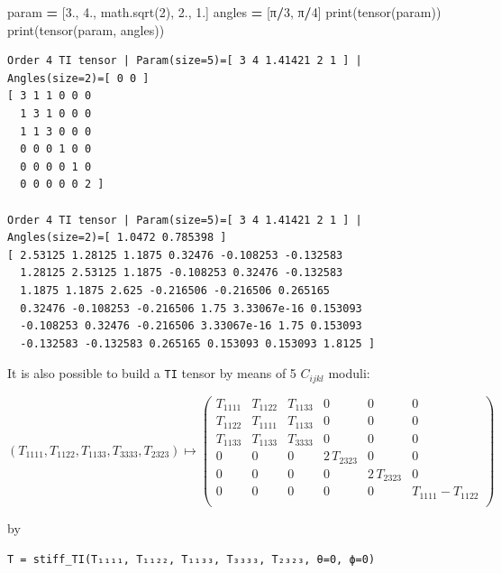 \documentclass[
  a4paper,
  numbers=noendperiod,
  DIV=12]{scrreprt}
\newenvironment{Shaded}{\begin{snugshade}}{\end{snugshade}}
\newcommand{\BuiltInTok}[1]{#1}
\newcommand{\DecValTok}[1]{\textcolor[rgb]{0.00,0.00,0.81}{#1}}
\newcommand{\FloatTok}[1]{\textcolor[rgb]{0.00,0.00,0.81}{#1}}
\newcommand{\NormalTok}[1]{#1}
\newcommand{\OperatorTok}[1]{\textcolor[rgb]{0.81,0.36,0.00}{\textbf{#1}}}
\begin{document}
\begin{Shaded}
\begin{Highlighting}[]
\NormalTok{param }\OperatorTok{=}\NormalTok{ [}\FloatTok{3.}\NormalTok{, }\FloatTok{4.}\NormalTok{, math.sqrt(}\DecValTok{2}\NormalTok{), }\FloatTok{2.}\NormalTok{, }\FloatTok{1.}\NormalTok{]}
\NormalTok{angles }\OperatorTok{=}\NormalTok{ [π}\OperatorTok{/}\DecValTok{3}\NormalTok{, π}\OperatorTok{/}\DecValTok{4}\NormalTok{]}
\BuiltInTok{print}\NormalTok{(tensor(param))}
\BuiltInTok{print}\NormalTok{(tensor(param, angles))}
\end{Highlighting}
\end{Shaded}

\begin{verbatim}
Order 4 TI tensor | Param(size=5)=[ 3 4 1.41421 2 1 ] | Angles(size=2)=[ 0 0 ]
[ 3 1 1 0 0 0 
  1 3 1 0 0 0 
  1 1 3 0 0 0 
  0 0 0 1 0 0 
  0 0 0 0 1 0 
  0 0 0 0 0 2 ]

Order 4 TI tensor | Param(size=5)=[ 3 4 1.41421 2 1 ] | Angles(size=2)=[ 1.0472 0.785398 ]
[ 2.53125 1.28125 1.1875 0.32476 -0.108253 -0.132583 
  1.28125 2.53125 1.1875 -0.108253 0.32476 -0.132583 
  1.1875 1.1875 2.625 -0.216506 -0.216506 0.265165 
  0.32476 -0.108253 -0.216506 1.75 3.33067e-16 0.153093 
  -0.108253 0.32476 -0.216506 3.33067e-16 1.75 0.153093 
  -0.132583 -0.132583 0.265165 0.153093 0.153093 1.8125 ]
\end{verbatim}

It is also possible to build a \texttt{TI} tensor by means of 5
\(C_{ijkl}\) moduli:

\[
(T_{1 1 1 1}, T_{1 1 2 2}, T_{1 1 3 3}, T_{3 3 3 3}, T_{2 3 2 3})
\mapsto
\left(
\begin{array}{cccccc}
T_{1 1 1 1} & T_{1 1 2 2} & T_{1 1 3 3} & 0 & 0 & 0 \\
T_{1 1 2 2} & T_{1 1 1 1} & T_{1 1 3 3} & 0 & 0 & 0 \\
T_{1 1 3 3} & T_{1 1 3 3} & T_{3 3 3 3} & 0 & 0 & 0 \\
0 & 0 & 0 & 2 \, T_{2 3 2 3} & 0 & 0 \\
0 & 0 & 0 & 0 & 2 \, T_{2 3 2 3} & 0 \\
0 & 0 & 0 & 0 & 0 & T_{1 1 1 1} - T_{1 1 2 2} \\
\end{array}
\right)
\]

by

\texttt{T\ =\ stiff\_TI(T₁₁₁₁,\ T₁₁₂₂,\ T₁₁₃₃,\ T₃₃₃₃,\ T₂₃₂₃,\ θ=0,\ ϕ=0)}
\end{document}
